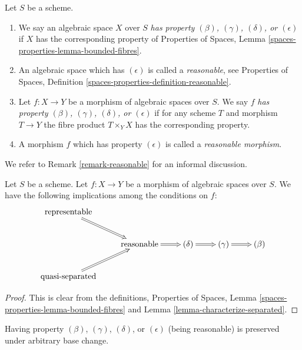\begin{definition}
\label{definition-relative-conditions}
Let $S$ be a scheme.
\begin{enumerate}
\item We say an algebraic space $X$ over $S$ {\it has
property $(\beta)$, $(\gamma)$, $(\delta)$, or $(\epsilon)$} if $X$
has the corresponding property of
Properties of Spaces, Lemma \ref{spaces-properties-lemma-bounded-fibres}.
\item An algebraic space which has $(\epsilon)$ is called a
{\it reasonable}, see 
Properties of Spaces, Definition \ref{spaces-properties-definition-reasonable}.
\item Let $f : X \to Y$ be a morphism of algebraic spaces over $S$.
We say $f$ {\it has property $(\beta)$, $(\gamma)$, $(\delta)$,
or $(\epsilon)$} if for any scheme $T$ and morphism $T \to Y$
the fibre product $T \times_Y X$ has the corresponding property.
\item A morphism $f$ which has property $(\epsilon)$ is called a
{\it reasonable morphism}.
\end{enumerate}
\end{definition}

\noindent
We refer to Remark \ref{remark-reasonable} for an informal discussion.

\begin{lemma}
\label{lemma-properties-trivial-implications}
Let $S$ be a scheme.
Let $f : X \to Y$ be a morphism of algebraic spaces over $S$.
We have the following implications among the conditions on $f$:
$$
\xymatrix{
\text{representable} \ar@{=>}[rd] & & & & \\
& \text{reasonable} \ar@{=>}[r] & (\delta) \ar@{=>}[r] &
(\gamma) \ar@{=>}[r] & (\beta) \\
\text{quasi-separated} \ar@{=>}[ru] & & & &
}
$$
\end{lemma}

\begin{proof}
This is clear from the definitions,
Properties of Spaces, Lemma \ref{spaces-properties-lemma-bounded-fibres}
and
Lemma \ref{lemma-characterize-separated}.
\end{proof}


\begin{lemma}
\label{lemma-base-change-relative-conditions}
Having property $(\beta)$, $(\gamma)$, $(\delta)$, or $(\epsilon)$
(being reasonable) is preserved under arbitrary base change.
\end{lemma}

